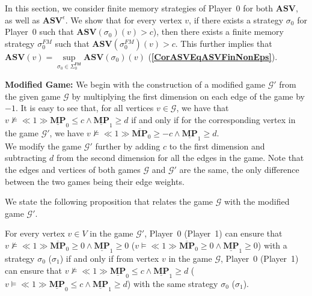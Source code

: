 In this section, we consider finite memory strategies of Player~$0$ for both $\mathbf{ASV}$, as well as $\mathbf{ASV}^\epsilon$. We show that for every vertex $v$, if there exists a strategy $\sigma_0$ for Player~0 such that $\mathbf{ASV}(\sigma_0)(v) > c$), then there exists a finite memory strategy $\sigma_0^{FM}$ such that $\mathbf{ASV}(\sigma_0^{FM})(v) > c$. This further implies that $\mathbf{ASV}(v) = \sup\limits_{\sigma_0 \in \Sigma_0^{\mathsf{FM}}} \mathbf{ASV}(\sigma_0)(v)$ (\textbf{\cref{CorASVEqASVFinNonEps}}).

\textbf{Modified Game:} We begin with the construction of a modified game $\mathcal{G'}$ from the given game $\mathcal{G}$ by multiplying the first dimension on each edge of the game by $-1$. It is easy to see that, for all vertices $v \in \mathcal{G}$, we have that $v \nvDash \ll 1 \gg \underline{\mathbf{MP}}_0 \leqslant c \land \underline{\mathbf{MP}}_1 \geqslant d$ if and only if for the corresponding vertex in the game $\mathcal{G'}$, we have $v \nvDash \ll 1 \gg \overline{\mathbf{MP}}_0 \geqslant -c \land \underline{\mathbf{MP}}_1 \geqslant d$.\\ 
\noindent We modify the game $\mathcal{G'}$ further by adding $c$ to the first dimension and subtracting $d$ from the second dimension for all the edges in the game. Note that the edges and vertices of both games $\mathcal{G}$ and $\mathcal{G'}$ are the same, the only difference between the two games being their edge weights.

We state the following proposition that relates the game $\mathcal{G}$ with the modified game $\mathcal{G'}$.

\begin{proposition}
\label{PropGameStrEqNewGameStrNonEps}
For every vertex $v \in V$ in the game $\mathcal{G'}$, Player~0 (Player~1) can ensure that $v \nvDash \ll 1 \gg \overline{\mathbf{MP}}_0 \geqslant 0 \land \underline{\mathbf{MP}}_1 \geqslant 0$ ($v \models \ll 1 \gg \overline{\mathbf{MP}}_0 \geqslant 0 \land \underline{\mathbf{MP}}_1 \geqslant 0$) with a strategy $\sigma_0$ ($\sigma_1$) if and only if from vertex $v$ in the game $\mathcal{G}$, Player~0 (Player~1) can ensure that $v \nvDash \ll 1 \gg \underline{\mathbf{MP}}_0 \leqslant c \land \underline{\mathbf{MP}}_1 \geqslant d$ ($v \models \ll 1 \gg \underline{\mathbf{MP}}_0 \leqslant c \land \underline{\mathbf{MP}}_1 \geqslant d$) with the same strategy $\sigma_0$ ($\sigma_1$).
\end{proposition}

